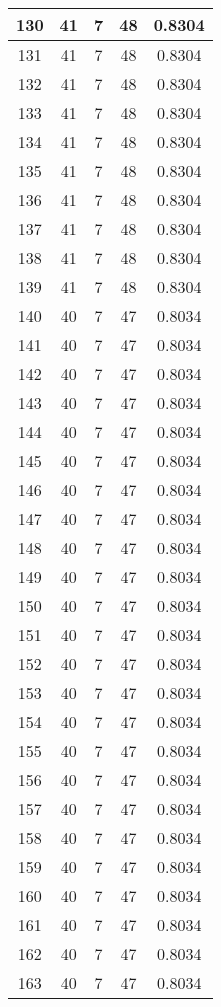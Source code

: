 \documentclass[letterpaper, 12pt]{article}
\begin{document}
\begin{longtable}{|c|c|c|c|c|}
\hline
130 & 41 & 7 & 48 & 0.8304 \\
\hline
131 & 41 & 7 & 48 & 0.8304 \\
\hline
132 & 41 & 7 & 48 & 0.8304 \\
\hline
133 & 41 & 7 & 48 & 0.8304 \\
\hline
134 & 41 & 7 & 48 & 0.8304 \\
\hline
135 & 41 & 7 & 48 & 0.8304 \\
\hline
136 & 41 & 7 & 48 & 0.8304 \\
\hline
137 & 41 & 7 & 48 & 0.8304 \\
\hline
138 & 41 & 7 & 48 & 0.8304 \\
\hline
139 & 41 & 7 & 48 & 0.8304 \\
\hline
140 & 40 & 7 & 47 & 0.8034 \\
\hline
141 & 40 & 7 & 47 & 0.8034 \\
\hline
142 & 40 & 7 & 47 & 0.8034 \\
\hline
143 & 40 & 7 & 47 & 0.8034 \\
\hline
144 & 40 & 7 & 47 & 0.8034 \\
\hline
145 & 40 & 7 & 47 & 0.8034 \\
\hline
146 & 40 & 7 & 47 & 0.8034 \\
\hline
147 & 40 & 7 & 47 & 0.8034 \\
\hline
148 & 40 & 7 & 47 & 0.8034 \\
\hline
149 & 40 & 7 & 47 & 0.8034 \\
\hline
150 & 40 & 7 & 47 & 0.8034 \\
\hline
151 & 40 & 7 & 47 & 0.8034 \\
\hline
152 & 40 & 7 & 47 & 0.8034 \\
\hline
153 & 40 & 7 & 47 & 0.8034 \\
\hline
154 & 40 & 7 & 47 & 0.8034 \\
\hline
155 & 40 & 7 & 47 & 0.8034 \\
\hline
156 & 40 & 7 & 47 & 0.8034 \\
\hline
157 & 40 & 7 & 47 & 0.8034 \\
\hline
158 & 40 & 7 & 47 & 0.8034 \\
\hline
159 & 40 & 7 & 47 & 0.8034 \\
\hline
160 & 40 & 7 & 47 & 0.8034 \\
\hline
161 & 40 & 7 & 47 & 0.8034 \\
\hline
162 & 40 & 7 & 47 & 0.8034 \\
\hline
163 & 40 & 7 & 47 & 0.8034 \\

\end{longtable}
\end{document}
